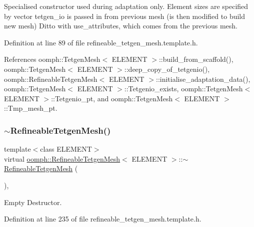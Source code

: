 Specialised constructor used during adaptation only. Element sizes are specified by vector tetgen\+\_\+io is passed in from previous mesh (is then modified to build new mesh) Ditto with use\+\_\+attributes, which comes from the previous mesh. 



Definition at line 89 of file refineable\+\_\+tetgen\+\_\+mesh.\+template.\+h.



References oomph\+::\+Tetgen\+Mesh$<$ E\+L\+E\+M\+E\+N\+T $>$\+::build\+\_\+from\+\_\+scaffold(), oomph\+::\+Tetgen\+Mesh$<$ E\+L\+E\+M\+E\+N\+T $>$\+::deep\+\_\+copy\+\_\+of\+\_\+tetgenio(), oomph\+::\+Refineable\+Tetgen\+Mesh$<$ E\+L\+E\+M\+E\+N\+T $>$\+::initialise\+\_\+adaptation\+\_\+data(), oomph\+::\+Tetgen\+Mesh$<$ E\+L\+E\+M\+E\+N\+T $>$\+::\+Tetgenio\+\_\+exists, oomph\+::\+Tetgen\+Mesh$<$ E\+L\+E\+M\+E\+N\+T $>$\+::\+Tetgenio\+\_\+pt, and oomph\+::\+Tetgen\+Mesh$<$ E\+L\+E\+M\+E\+N\+T $>$\+::\+Tmp\+\_\+mesh\+\_\+pt.

\mbox{\label{classoomph_1_1RefineableTetgenMesh_ac2ac6c6961647d0f332a6742f52dd27d}} 
\subsubsection{\texorpdfstring{$\sim$\+Refineable\+Tetgen\+Mesh()}{~RefineableTetgenMesh()}}
{\footnotesize\ttfamily template$<$class E\+L\+E\+M\+E\+NT$>$ \\
virtual \hyperlink{classoomph_1_1RefineableTetgenMesh}{oomph\+::\+Refineable\+Tetgen\+Mesh}$<$ E\+L\+E\+M\+E\+NT $>$\+::$\sim$\hyperlink{classoomph_1_1RefineableTetgenMesh}{Refineable\+Tetgen\+Mesh} (\begin{DoxyParamCaption}{ }\end{DoxyParamCaption})\hspace{0.3cm}{\ttfamily [inline]}, {\ttfamily [virtual]}}



Empty Destructor. 



Definition at line 235 of file refineable\+\_\+tetgen\+\_\+mesh.\+template.\+h.




